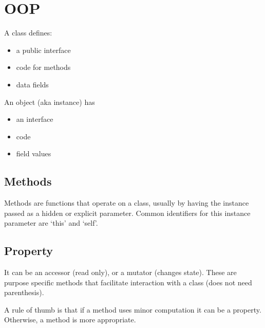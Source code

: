 \section{OOP}
A class defines:
\begin{itemize}
  \item a public interface
  \item code for methods
  \item data fields
\end{itemize}

An object (aka instance) has
\begin{itemize}
  \item an interface
  \item code
  \item field values
\end{itemize}

\subsection*{Methods}
Methods are functions that operate on a class, usually by having the
instance passed as a hidden or explicit parameter. Common identifiers
for this instance parameter are `this' and `self'.

\subsection*{Property}
It can be an accessor (read only), or a mutator (changes state). These
are purpose specific methods that facilitate interaction with a class
(does not need parenthesis).

A rule of thumb is that if a method uses minor computation it can be
a property. Otherwise, a method is more appropriate.